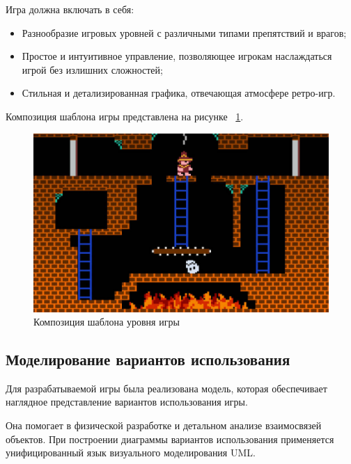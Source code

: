 Игра должна включать в себя:
\begin{itemize}
    \item Разнообразие игровых уровней с различными типами препятствий и врагов;
    \item Простое и интуитивное управление, позволяющее игрокам наслаждаться игрой без излишних сложностей;
    \item Стильная и детализированная графика, отвечающая атмосфере ретро-игр.
\end{itemize}

Композиция шаблона игры представлена на рисунке ~\ref{fig:maket1}.

\begin{figure}[H]
	\centering
	\includegraphics[width=0.9\linewidth]{images/maket1}
	\caption{Композиция шаблона уровня игры}
	\label{fig:maket1}
\end{figure}


\subsection{Моделирование вариантов использования}

Для разрабатываемой игры была реализована модель, которая обеспечивает наглядное представление вариантов использования игры.

Она помогает в физической разработке и детальном анализе взаимосвязей объектов. При построении диаграммы вариантов использования применяется унифицированный язык визуального моделирования UML.

